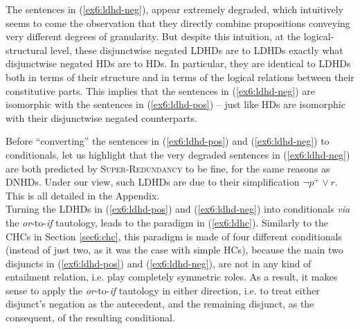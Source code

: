 The sentences in (\ref{ex6:ldhd-neg}), appear extremely degraded, which intuitively seems to come the observation that they directly combine propositions conveying very different degrees of granularity. But despite this intuition, at the logical-structural level, these disjunctwise negated LDHDs are to LDHDs exactly what disjunctwise negated HDs are to HDs. In particular, they are identical to LDHDs both in terms of their structure and in terms of the logical relations between their constitutive parts. This implies that the sentences in (\ref{ex6:ldhd-neg}) are isomorphic with the sentences in (\ref{ex6:ldhd-pos}) -- just like HDs are isomorphic with their disjunctwise negated counterparts.

Before ``converting'' the sentences in (\ref{ex6:ldhd-pos}) and (\ref{ex6:ldhd-neg}) to conditionals, let us highlight that the very degraded sentences in (\ref{ex6:ldhd-neg}) are both predicted by \textsc{Super-Redundancy} to be fine, for the same reasons as DNHDs. Under our view, such LDHDs are  due to their simplification $\neg p^+ \vee r$. This is all detailed in the Appendix.\\


Turning the LDHDs in (\ref{ex6:ldhd-pos}) and (\ref{ex6:ldhd-neg}) into conditionals \textit{via} the \textit{or}-to-\textit{if} tautology, leads to the paradigm in (\ref{ex6:ldhc}). Similarly to the CHCs in Section \ref{sec6:chc}, this paradigm is made of four different conditionals (instead of just two, as it was the case with simple HCs), because the main two disjuncts in (\ref{ex6:ldhd-pos}) and (\ref{ex6:ldhd-neg}), are not in any kind of entailment relation, i.e. play completely symmetric roles. As a result, it makes sense to apply the \textit{or}-to-\textit{if} tautology in either direction, i.e. to treat either disjunct's negation as the antecedent, and the remaining disjunct, as the consequent, of the resulting conditional.

